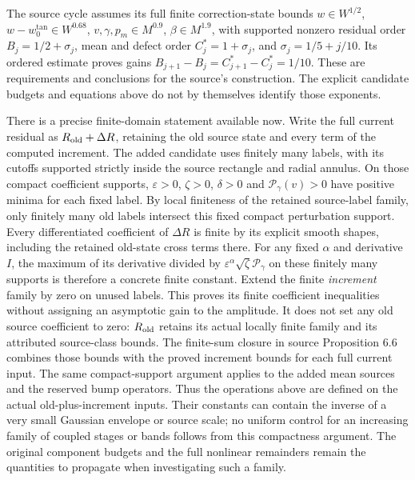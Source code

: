 The source cycle assumes its full finite correction-state bounds
$w\in W^{1/2}$, $w-w_0^{\tan}\in W^{0.68}$,
$v,\gamma,p_m\in M^{0.9}$, $\beta\in M^{1.9}$,
with supported nonzero residual order
$B_j=1/2+\sigma_j$, mean and defect order $C_j^*=1+\sigma_j$,
and $\sigma_j=1/5+j/10$. Its ordered estimate proves gains
$B_{j+1}-B_j=C_{j+1}^*-C_j^*=1/10$.
These are requirements and conclusions for the source's construction.
The explicit candidate budgets and equations above do not by
themselves identify those exponents.

There is a precise finite-domain statement available now. Write the
full current residual as $R_{\rm old}+\Delta R$, retaining the old
source state and every term of the computed increment. The added
candidate uses finitely many labels, with its cutoffs supported
strictly inside the source rectangle and radial annulus. On those
compact coefficient supports, $\varepsilon>0$, $\zeta>0$,
$\delta>0$ and $\mathcal P_\gamma(v)>0$ have positive minima
for each fixed label. By local finiteness of the retained source-label
family, only finitely many old labels intersect this fixed compact
perturbation support. Every differentiated coefficient of $\Delta R$
is finite by its explicit smooth shapes, including the retained old-state
cross terms there. For any fixed
$\alpha$ and derivative $I$, the maximum of its derivative divided by
$\varepsilon^\alpha\sqrt\zeta\mathcal P_\gamma$ on these finitely
many supports is therefore a concrete finite constant. Extend the
finite \emph{increment} family by zero on unused labels. This proves its
finite coefficient inequalities without assigning an asymptotic gain
to the amplitude. It does not set any old source coefficient to zero:
$R_{\rm old}$ retains its actual locally finite family and its attributed
source-class bounds. The finite-sum closure in source Proposition 6.6
combines those bounds with the proved increment bounds for each full
current input. The same compact-support argument applies to the added
mean sources and the reserved bump operators. Thus the operations
above are defined on the actual old-plus-increment inputs.
Their constants can contain the inverse of a very small Gaussian
envelope or source scale; no uniform control for an increasing family
of coupled stages or bands follows from this compactness argument.
The original component budgets and the full nonlinear remainders
remain the quantities to propagate when investigating such a family.
